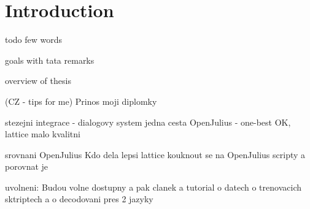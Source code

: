 \chapter{Introduction}
\label{chap:intro}

todo few words

goals with tata remarks


overview of thesis


(CZ - tips for me)
Prinos moji diplomky
  
stezejni integrace - dialogovy system
    jedna cesta OpenJulius - one-best OK, lattice malo kvalitni

srovnani OpenJulius
    Kdo dela lepsi lattice
    kouknout se na OpenJulius scripty
    a porovnat je

uvolneni: Budou volne dostupny a pak clanek a tutorial
o datech o trenovacich sktriptech a o decodovani pres 2 jazyky



  
